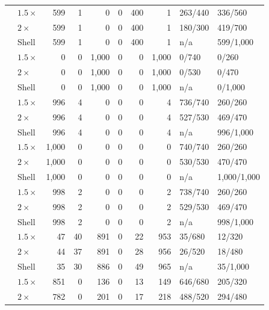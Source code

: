\begin{longtable}{@{}L{1.38in}lrrrrrrll@{}}
\addlinespace[3pt]
 & $1.5\times$ & 599 & 1 & 0 & 0 & 400 & 1 & 263/440 & 336/560\\*
 & $2\times$ & 599 & 1 & 0 & 0 & 400 & 1 & 180/300 & 419/700\\*
 & Shell & 599 & 1 & 0 & 0 & 400 & 1 & n/a & 599/1,000\\
\addlinespace[3pt]
 & $1.5\times$ & 0 & 0 & 1,000 & 0 & 0 & 1,000 & 0/740 & 0/260\\*
 & $2\times$ & 0 & 0 & 1,000 & 0 & 0 & 1,000 & 0/530 & 0/470\\*
 & Shell & 0 & 0 & 1,000 & 0 & 0 & 1,000 & n/a & 0/1,000\\
\addlinespace[3pt]
 & $1.5\times$ & 996 & 4 & 0 & 0 & 0 & 4 & 736/740 & 260/260\\*
 & $2\times$ & 996 & 4 & 0 & 0 & 0 & 4 & 527/530 & 469/470\\*
 & Shell & 996 & 4 & 0 & 0 & 0 & 4 & n/a & 996/1,000\\
\addlinespace[3pt]
 & $1.5\times$ & 1,000 & 0 & 0 & 0 & 0 & 0 & 740/740 & 260/260\\*
 & $2\times$ & 1,000 & 0 & 0 & 0 & 0 & 0 & 530/530 & 470/470\\*
 & Shell & 1,000 & 0 & 0 & 0 & 0 & 0 & n/a & 1,000/1,000\\
\addlinespace[3pt]
 & $1.5\times$ & 998 & 2 & 0 & 0 & 0 & 2 & 738/740 & 260/260\\*
 & $2\times$ & 998 & 2 & 0 & 0 & 0 & 2 & 529/530 & 469/470\\*
 & Shell & 998 & 2 & 0 & 0 & 0 & 2 & n/a & 998/1,000\\
\addlinespace[3pt]
 & $1.5\times$ & 47 & 40 & 891 & 0 & 22 & 953 & 35/680 & 12/320\\*
 & $2\times$ & 44 & 37 & 891 & 0 & 28 & 956 & 26/520 & 18/480\\*
 & Shell & 35 & 30 & 886 & 0 & 49 & 965 & n/a & 35/1,000\\
\addlinespace[3pt]
 & $1.5\times$ & 851 & 0 & 136 & 0 & 13 & 149 & 646/680 & 205/320\\*
 & $2\times$ & 782 & 0 & 201 & 0 & 17 & 218 & 488/520 & 294/480\\*

\end{longtable}
